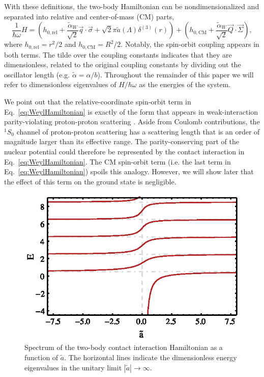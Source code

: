 \documentclass[%
 onecolumn,
 notitlepage,
 amsmath,amssymb,
 aps,
]{revtex4-1}
\begin{document}
With these definitions, the two-body Hamiltonian can be nondimensionalized and separated into relative and center-of-mass (CM) parts,
\begin{equation}\label{eq:WeylHamiltonian}
\frac{1}{\hbar\omega}H=\left(h_{0,\text{rel}}+\frac{\tilde{\alpha}_W}{\sqrt{2}} \vec{q}\cdot\vec{\sigma} + \sqrt{2}\pi \tilde{a}(\Lambda) \delta^{(3)}(r)\right)+\left(h_{0,\text{CM}}+\frac{\tilde{\alpha}_W}{\sqrt{2}} \vec{Q}\cdot\vec{\Sigma} \right),
\end{equation}
where $h_{0,\text{rel}}=r^2/2$ and $h_{0,\text{CM}}=R^2/2$. Notably, the spin-orbit coupling appears in both terms.  The tilde over the coupling constants indicates that they are dimensionless, related to the original coupling constants by dividing out the oscillator length (e.g. $\tilde{\alpha}=\alpha/b$). Throughout the remainder of this paper we will refer to dimensionless eigenvalues of $H/\hbar\omega$ as the energies of the system.

We point out that the relative-coordinate spin-orbit term in Eq.~\eqref{eq:WeylHamiltonian} is exactly of the form that appears in weak-interaction parity-violating proton-proton scattering \cite{Haxton:2013aca,deVries:2014vqa}.  Aside from Coulomb contributions, the $^1S_0$ channel of proton-proton scattering has a scattering length that is an order of magnitude larger than its effective range.  The parity-conserving part of the nuclear potential could therefore be represented by the contact interaction in Eq.~\eqref{eq:WeylHamiltonian}.  The CM spin-orbit term (i.e. the last term in Eq.~\eqref{eq:WeylHamiltonian}) spoils this analogy. However, we will show later that the effect of this term on the ground state is negligible. 

\begin{figure}
\includegraphics{Figures/BuschSpectrum}
\caption{\label{fig:BuschSpectrum}Spectrum of the two-body contact interaction Hamiltonian as a function of $\tilde a$. The horizontal lines indicate the dimensionless energy eigenvalues in the unitary limit $|\tilde{a}|\rightarrow\infty$.} 
\end{figure}
\end{document}
